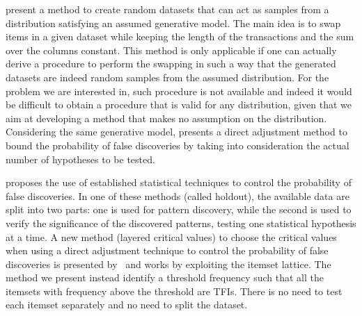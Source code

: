 \citet{GionisMMT07} present a method to create random datasets that can act as
samples from a distribution satisfying an assumed generative model. The main
idea is to swap items in a given dataset while keeping the length of the
transactions and the sum over the columns constant. This method is only
applicable if one can actually derive a procedure to perform the swapping in
such a way that the generated datasets are indeed random samples from the assumed
distribution. For the problem we are interested in, such procedure is not
available and indeed it would be difficult to obtain a procedure that is
valid for any distribution, given that we aim at developing a method that makes
no assumption on the distribution. Considering the same generative model,
\citet{Hanhijarvi11} presents a direct adjustment method to bound the
probability of false discoveries by taking into consideration the actual number
of hypotheses to be tested.

\citet{Webb07} proposes the use of established statistical techniques to control
the probability of false discoveries. %
In one of these methods (called holdout), the available data are split into two
parts: one is used for pattern discovery, while the second is used to verify the
significance of the discovered patterns, testing one statistical hypothesis at a
time. A new method (layered critical values) to choose the critical values when
using a direct adjustment technique to control the probability of false
discoveries is presented by~\citet{Webb08} and works by exploiting the itemset
lattice. The method we present instead identify a threshold frequency such that
all the itemsets with frequency above the threshold are TFIs. There is no need
to test each itemset separately and no need to split the dataset.

